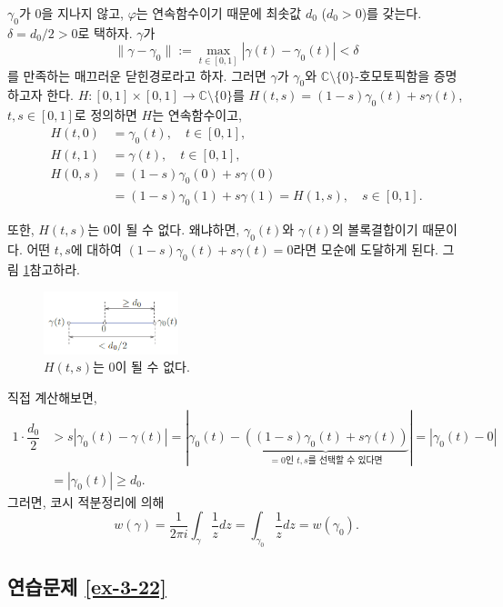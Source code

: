 \begin{itemize}
$\gamma_0$가 $0$을 지나지 않고, $\varphi$는 연속함수이기 때문에
최솟값 $d_0$ ($d_0>0$)를 갖는다.
$\delta = d_0/2 >0$로 택하자.
$\gamma$가 
\[
\|\gamma - \gamma_0\| := \max_{t\in[0,1]} | \gamma(t) - \gamma_0(t)| < \delta
\]
를 만족하는 매끄러운 닫힌경로라고 하자.
그러면
$\gamma$가 $\gamma_0$와 $\mathbb C\setminus \{0\}$-호모토픽함을 증명하고자 한다.
$H:[0,1]\times[0,1]\to \mathbb C\setminus\{0\}$를 
$H(t,s) = (1-s)\gamma_0(t) + s\gamma(t)$, $t,s\in[0,1]$로 정의하면
$H$는 연속함수이고,
\begin{align*}
H(t,0) &= \gamma_0(t), \quad t\in[0,1],\\
H(t,1) &= \gamma(t), \quad t\in[0,1],\\
H(0,s) &= (1-s)\gamma_0(0) + s\gamma(0) \\
&= (1-s)\gamma_0(1) + s\gamma(1)  = H(1,s), \quad s\in[0,1].
\end{align*}

또한, $H(t,s)$는 $0$이 될 수 없다. 왜냐하면,
$\gamma_0(t)$와 $\gamma(t)$의 볼록결합이기 때문이다.
어떤 $t,s$에 대하여 $(1-s)\gamma_0(t)+s\gamma(t)=0$라면
모순에 도달하게 된다. 그림 \ref{fig-5-19}\를 참고하라.

\begin{figure}[h!]
\begin{center}
\includegraphics[width=0.35\textwidth]{./Solution/figs/fig-5-19}
\end{center}
\caption{$H(t,s)$는 $0$이 될 수 없다.}
\label{fig-5-19}
\end{figure}
직접 계산해보면,
\begin{align*}
1\cdot \dfrac{d_0}2 &> s|\gamma_0(t) - \gamma(t)|
= | \gamma_0(t) - 
\underbrace{((1-s)\gamma_0(t) + s\gamma(t))}_{=0\text{인 $t,s$를 선택할 수 있다면}}
| = |\gamma_0(t) - 0| \\
&= |\gamma_0(t)| \ge d_0.
\end{align*}
그러면, 코시 적분정리에 의해
\[
w(\gamma) = \dfrac1{2\pi i} \int_\gamma \dfrac1z dz 
= \int_{\gamma_0} \dfrac1z dz  = w(\gamma_0).
\]
\end{itemize}

\subsection*{연습문제 \ref{ex-3-22}}

